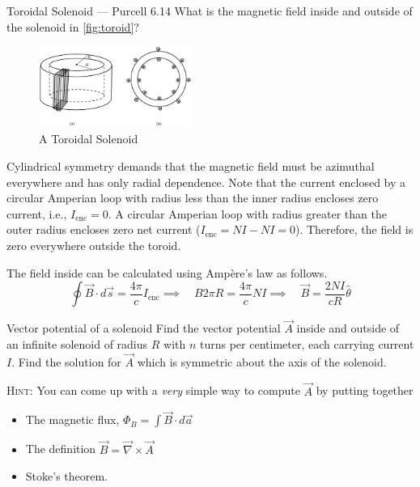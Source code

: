 \documentclass[makesolutionspdf]{esg8022pset}
\begin{document}
\begin{problem}{Toroidal Solenoid --- Purcell 6.14}
  What is the magnetic field inside and outside of the solenoid in \autoref{fig:toroid}?
  \begin{figure}[H]
    \centering
    \includegraphics[width = 5cm]{Toroid} 
    \caption{A Toroidal Solenoid}
    \label{fig:toroid}
  \end{figure}
\end{problem}

\begin{solution}
  Cylindrical symmetry demands that the magnetic field must be azimuthal
  everywhere and has only radial dependence.  Note that the current enclosed by
  a circular Amperian loop with radius less than the inner radius encloses zero
  current, i.e., $I_{\text{enc}} = 0$.  A circular Amperian loop with radius
  greater than the outer radius encloses zero net current ($I_{\text{enc}} = NI
  - NI = 0$). Therefore, the field is zero everywhere outside the toroid.

  The field inside can be calculated using Amp\`{e}re's law as follows.
  $$\oint \vec{B} \cdot d\vec{s} = \frac{4\pi}{c}I_{\text{enc}}  \implies \quad B 2 \pi R
  = \frac{4\pi}{c}NI  \implies \quad \vec{B} =
  \frac{2NI}{cR}\hat{\theta} $$
\end{solution}





\begin{problem}{Vector potential of a solenoid}
  Find the vector potential $\vec A$ inside and outside of an infinite solenoid
  of radius $R$ with $n$ turns per centimeter, each carrying current $I$.  Find
  the solution for $\vec A$ which is symmetric about the axis of the solenoid.

  \noindent \textsc{Hint}: You can come up with a \emph{very} simple way to
  compute $\vec A$ by putting together
  \begin{itemize}
    \item The magnetic flux, $\Phi_B = \int \vec B\cdot d\vec a$
    \item The definition $\vec B = \vec\nabla\times\vec A$
    \item Stoke's theorem.
  \end{itemize}
\end{problem}
\end{document}
